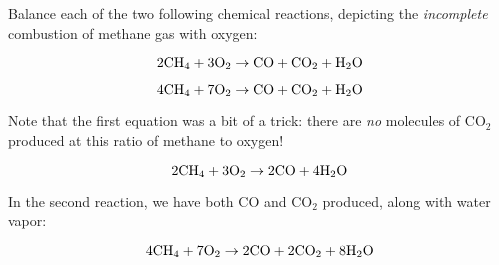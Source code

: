 

Balance each of the two following chemical reactions, depicting the {\it incomplete} combustion of methane gas with oxygen:

$$2\hbox{CH}_4 + 3\hbox{O}_2 \to \hbox{CO} + \hbox{CO}_2 + \hbox{H}_2\hbox{O}$$

\vskip 10pt

$$4\hbox{CH}_4 + 7\hbox{O}_2 \to \hbox{CO} + \hbox{CO}_2 + \hbox{H}_2\hbox{O}$$







\noindent
Note that the first equation was a bit of a trick: there are {\it no} molecules of CO$_{2}$ produced at this ratio of methane to oxygen!

$$2\hbox{CH}_4 + 3\hbox{O}_2 \to 2\hbox{CO} + 4\hbox{H}_2\hbox{O}$$

\vskip 10pt

\noindent
In the second reaction, we have both CO and CO$_{2}$ produced, along with water vapor:

$$4\hbox{CH}_4 + 7\hbox{O}_2 \to 2\hbox{CO} + 2\hbox{CO}_2 + 8\hbox{H}_2\hbox{O}$$











